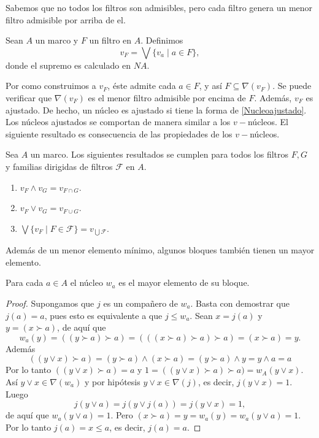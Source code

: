 Sabemos que no todos los filtros son admisibles, pero cada filtro genera un menor filtro admisible por arriba de el.

\begin{dfn}\label{Definicion5.5.6}
    Sean $A$ un marco y $F$ un filtro en $A$. Definimos 
    \begin{equation}\label{Nucleoajustado}
    v_F=\bigvee\{v_a\mid a\in F\},
    \end{equation}
    donde el supremo es calculado en $NA$.
\end{dfn}

Por como construimos a $v_F$, éste admite cada $a\in F$, y así $F\subseteq \nabla(v_F)$. Se puede verificar que $\nabla(v_F)$ es el menor filtro admisible por encima de $F$. Además, $v_F$ es ajustado. De hecho, un núcleo es ajustado si tiene la forma de \ref{Nucleoajustado}.\\

Los núcleos ajustados se comportan de manera similar a los $v-$núcleos. El siguiente resultado es consecuencia de las propiedades de los $v-$núcleos.

\begin{lem}\label{Lema5.5.7}
    Sea $A$ un marco. Los siguientes resultados se cumplen para todos los filtros $F, G$ y familias dirigidas de filtros $\mathcal{F}$ en $A$.
    \begin{enumerate}[$i)$]
        \item $v_F\wedge v_G=v_{F\cap G}$.
        \item $v_F\vee v_G=v_{F\cup G}$.
        \item $\bigvee\{v_F\mid F\in \mathcal{F}\}=v_{\bigcup \mathcal{F}}$.
    \end{enumerate}
\end{lem}

Además de un menor elemento mínimo, algunos bloques también tienen un mayor elemento.

\begin{lem}\label{Lema5.5.8}
    Para cada $a\in A$ el núcleo $w_a$ es el mayor elemento de su bloque.
\end{lem}

\begin{proof}
    Supongamos que $j$ es un compañero de $w_a$. Basta con demostrar que $j(a)=a$, pues esto es equivalente a que $j\leq w_a$. Sean $x=j(a)$ y $y=(x\succ a)$, de aquí que 
    \[
    w_a(y)=((y\succ a)\succ a)=(((x\succ a)\succ a)\succ a)=(x\succ a)=y.
    \]
    Además
    \[
    ((y\vee x)\succ a)=(y\succ a)\wedge (x\succ a)=(y\succ a)\wedge y=y\wedge a=a
    \]
    Por lo tanto $((y\vee x)\succ a)=a$ y $1=((y\vee x)\succ a)\succ a)=w_A(y\vee x)$. Así $y\vee x\in \nabla(w_a)$ y por hipótesis $y\vee x\in \nabla (j)$, es decir, $j(y\vee x)=1$.\\
    Luego 
    \[
    j(y\vee a)=j(y\vee j(a))=j(y\vee x)=1,
    \]
    de aquí que $w_a(y\vee a)=1$. Pero $(x\succ a)=y=w_a(y)=w_a(y\vee a)=1$. Por lo tanto $j(a)=x\leq a$, es decir, $j(a)=a$.
\end{proof}

